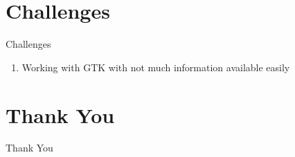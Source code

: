 \documentclass{beamer}
\begin{document}
\section{Challenges}

\begin{frame}{Challenges}
    \begin{enumerate}
        \item Working with GTK with not much information available easily
    \end{enumerate}
\end{frame}

\section{Thank You}

\begin{frame}{ }
    \begin{center}
        \LARGE
        Thank You
    \end{center}
\end{frame}
\end{document}
